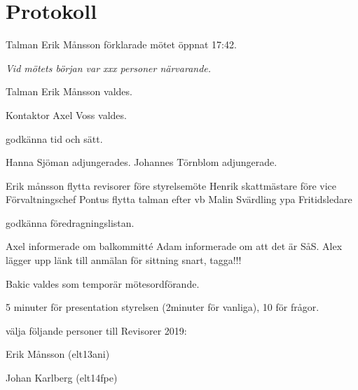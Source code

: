 \documentclass[10pt]{article}
\def\mo{Erik Månsson}
\def\ms{Axel Voss}
\begin{document}
\section*{Protokoll}
\begin{paragrafer}
Talman {\mo} förklarade mötet öppnat 17:42.

\emph{Vid mötets början var xxx personer närvarande.}

Talman {\mo} valdes.

Kontaktor {\ms} valdes.


\Mba godkänna tid och sätt.


\valavj


Hanna Sjöman adjungerades.
Johannes Törnblom adjungerade.

\emph{\ingaadj}

Erik månsson \ypa flytta revisorer före styrelsemöte
Henrik \ypa skattmästare före vice Förvaltningschef
Pontus flytta talman efter vb
Malin Svärdling ypa Fritidsledare


\Mba godkänna föredragningslistan.



Axel informerade om balkommitté
Adam informerade om att det är SåS.
Alex lägger upp länk till anmälan för sittning snart, tagga!!! 


    Bakic valdes som temporär mötesordförande.

    5 minuter för presentation styrelsen (2minuter för vanliga), 10 för frågor. 

\newpage
{}
\begin{paralist}

    \Mba välja följande personer till Revisorer 2019:
    \begin{tightdashlist}
        \item Erik Månsson (elt13ani)
        \item Johan Karlberg (elt14fpe)
    \end{tightdashlist}


\end{paralist}
\end{paragrafer}
\end{document}
